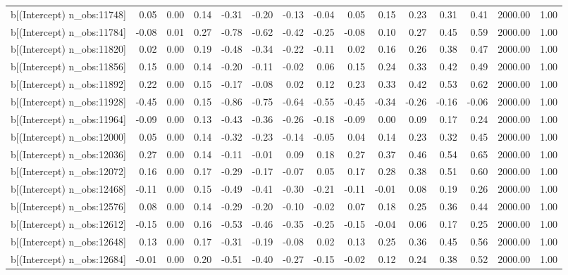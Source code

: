 \begin{table}[ht]
\begin{tabular}{rrrrrrrrrrrrrrr}
  b[(Intercept) n\_obs:11748] & 0.05 & 0.00 & 0.14 & -0.31 & -0.20 & -0.13 & -0.04 & 0.05 & 0.15 & 0.23 & 0.31 & 0.41 & 2000.00 & 1.00 \\ 
  b[(Intercept) n\_obs:11784] & -0.08 & 0.01 & 0.27 & -0.78 & -0.62 & -0.42 & -0.25 & -0.08 & 0.10 & 0.27 & 0.45 & 0.59 & 2000.00 & 1.00 \\ 
  b[(Intercept) n\_obs:11820] & 0.02 & 0.00 & 0.19 & -0.48 & -0.34 & -0.22 & -0.11 & 0.02 & 0.16 & 0.26 & 0.38 & 0.47 & 2000.00 & 1.00 \\ 
  b[(Intercept) n\_obs:11856] & 0.15 & 0.00 & 0.14 & -0.20 & -0.11 & -0.02 & 0.06 & 0.15 & 0.24 & 0.33 & 0.42 & 0.49 & 2000.00 & 1.00 \\ 
  b[(Intercept) n\_obs:11892] & 0.22 & 0.00 & 0.15 & -0.17 & -0.08 & 0.02 & 0.12 & 0.23 & 0.33 & 0.42 & 0.53 & 0.62 & 2000.00 & 1.00 \\ 
  b[(Intercept) n\_obs:11928] & -0.45 & 0.00 & 0.15 & -0.86 & -0.75 & -0.64 & -0.55 & -0.45 & -0.34 & -0.26 & -0.16 & -0.06 & 2000.00 & 1.00 \\ 
  b[(Intercept) n\_obs:11964] & -0.09 & 0.00 & 0.13 & -0.43 & -0.36 & -0.26 & -0.18 & -0.09 & 0.00 & 0.09 & 0.17 & 0.24 & 2000.00 & 1.00 \\ 
  b[(Intercept) n\_obs:12000] & 0.05 & 0.00 & 0.14 & -0.32 & -0.23 & -0.14 & -0.05 & 0.04 & 0.14 & 0.23 & 0.32 & 0.45 & 2000.00 & 1.00 \\ 
  b[(Intercept) n\_obs:12036] & 0.27 & 0.00 & 0.14 & -0.11 & -0.01 & 0.09 & 0.18 & 0.27 & 0.37 & 0.46 & 0.54 & 0.65 & 2000.00 & 1.00 \\ 
  b[(Intercept) n\_obs:12072] & 0.16 & 0.00 & 0.17 & -0.29 & -0.17 & -0.07 & 0.05 & 0.17 & 0.28 & 0.38 & 0.51 & 0.60 & 2000.00 & 1.00 \\ 
  b[(Intercept) n\_obs:12468] & -0.11 & 0.00 & 0.15 & -0.49 & -0.41 & -0.30 & -0.21 & -0.11 & -0.01 & 0.08 & 0.19 & 0.26 & 2000.00 & 1.00 \\ 
  b[(Intercept) n\_obs:12576] & 0.08 & 0.00 & 0.14 & -0.29 & -0.20 & -0.10 & -0.02 & 0.07 & 0.18 & 0.25 & 0.36 & 0.44 & 2000.00 & 1.00 \\ 
  b[(Intercept) n\_obs:12612] & -0.15 & 0.00 & 0.16 & -0.53 & -0.46 & -0.35 & -0.25 & -0.15 & -0.04 & 0.06 & 0.17 & 0.25 & 2000.00 & 1.00 \\ 
  b[(Intercept) n\_obs:12648] & 0.13 & 0.00 & 0.17 & -0.31 & -0.19 & -0.08 & 0.02 & 0.13 & 0.25 & 0.36 & 0.45 & 0.56 & 2000.00 & 1.00 \\ 
  b[(Intercept) n\_obs:12684] & -0.01 & 0.00 & 0.20 & -0.51 & -0.40 & -0.27 & -0.15 & -0.02 & 0.12 & 0.24 & 0.38 & 0.52 & 2000.00 & 1.00 \\ 

\end{tabular}
\end{table}
